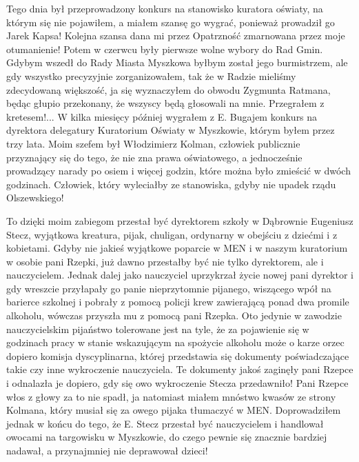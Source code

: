 Tego dnia był przeprowadzony konkurs na stanowisko kuratora oświaty, na którym się nie pojawiłem, a miałem szansę go wygrać, ponieważ prowadził go Jarek Kapsa! Kolejna szansa dana mi przez Opatrzność zmarnowana przez moje otumanienie! Potem w czerwcu były pierwsze wolne wybory do Rad Gmin. Gdybym wszedł do Rady Miasta Myszkowa byłbym został jego burmistrzem, ale gdy wszystko precyzyjnie zorganizowałem, tak że w Radzie mieliśmy zdecydowaną większość, ja się wyznaczyłem do obwodu Zygmunta Ratmana, będąc głupio przekonany, że wszyscy będą głosowali na mnie. Przegrałem z kretesem!... W kilka miesięcy później wygrałem z E. Bugajem konkurs na dyrektora delegatury Kuratorium Oświaty w Myszkowie, którym byłem przez trzy lata. Moim szefem był Włodzimierz Kolman, człowiek publicznie przyznający się do tego, że nie zna prawa oświatowego, a jednocześnie prowadzący narady po osiem i więcej godzin, które można było zmieścić w dwóch godzinach. Człowiek, który wyleciałby ze stanowiska, gdyby nie upadek rządu Olszewskiego!

To dzięki moim zabiegom przestał być dyrektorem szkoły w Dąbrownie Eugeniusz Stecz, wyjątkowa kreatura, pijak, chuligan, ordynarny w obejściu z dziećmi i z kobietami. Gdyby nie jakieś wyjątkowe poparcie w MEN i w naszym kuratorium w osobie pani Rzepki, już dawno przestałby być nie tylko dyrektorem, ale i nauczycielem. Jednak dalej jako nauczyciel uprzykrzał życie nowej pani dyrektor i gdy wreszcie przyłapały go panie nieprzytomnie pijanego, wiszącego wpół na barierce szkolnej i pobrały z pomocą policji krew zawierającą ponad dwa promile alkoholu, wówczas przyszła mu z pomocą pani Rzepka. Oto jedynie w zawodzie nauczycielskim pijaństwo tolerowane jest na tyle, że za pojawienie się w godzinach pracy w stanie wskazującym na spożycie alkoholu może o karze orzec dopiero komisja dyscyplinarna, której przedstawia się dokumenty poświadczające takie czy inne wykroczenie nauczyciela. Te dokumenty jakoś zaginęły pani Rzepce i odnalazła je dopiero, gdy się owo wykroczenie Stecza przedawniło! Pani Rzepce włos z głowy za to nie spadł, ja natomiast miałem mnóstwo kwasów ze strony Kolmana, który musiał się za owego pijaka tłumaczyć w MEN. Doprowadziłem jednak w końcu do tego, że E. Stecz przestał być nauczycielem i handlował owocami na targowisku w Myszkowie, do czego pewnie się znacznie bardziej nadawał, a przynajmniej nie deprawował dzieci!

